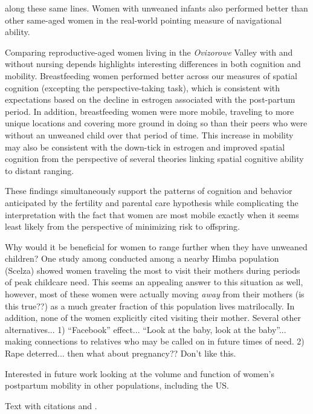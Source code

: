 along these same lines.  Women with unweaned infants also performed better than other same-aged women in the real-world pointing measure of navigational ability.

Comparing reproductive-aged women living in the \emph{Ovizorowe} Valley with and without nursing depends highlights interesting differences in both cognition and mobility.  Breastfeeding women performed better across our measures of spatial cognition (excepting the perspective-taking task), which is consistent with expectations based on the decline in estrogen associated with the post-partum period.  In addition, breastfeeding women were more mobile, traveling to more unique locations and covering more ground in doing so than their peers who were without an unweaned child over that period of time.  This increase in mobility may also be consistent with the down-tick in estrogen and improved spatial cognition from the perspective of several theories linking spatial cognitive ability to distant ranging.  

These findings simultaneously support the patterns of cognition and behavior anticipated by the fertility and parental care hypothesis while complicating the interpretation with the fact that women are most mobile exactly when it seems least likely from the perspective of minimizing risk to offspring.

Why would it be beneficial for women to range further when they have unweaned children?  One study among conducted among a nearby  Himba population (Scelza) showed women traveling the most to visit their mothers during periods of peak childcare need.  This seems an appealing answer to this situation as well, however, most of these women were actually moving \emph{away} from their mothers (is this true??) as a much greater fraction of this population lives matrilocally.  In addition, none of the women explicitly cited visiting their mother.  Several other alternatives... 1) ``Facebook'' effect...  ``Look at the baby, look at the baby''... making connections to relatives who may be called on in future times of need.  2) Rape deterred... then what about pregnancy??  Don't like this.

Interested in future work looking at the volume and function of women's postpartum mobility in other populations, including the US.


Text with citations \cite{RefB} and \cite{RefJ}.




